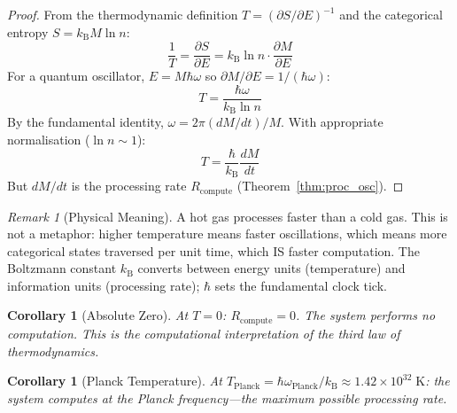 \documentclass[twocolumn,10pt,a4paper]{article}
\theoremstyle{plain}
\newtheorem{corollary}[theorem]{Corollary}
\theoremstyle{definition}
\theoremstyle{remark}
\newtheorem{remark}[theorem]{Remark}
\newcommand{\kB}{k_{\mathrm{B}}}
\begin{document}
\begin{proof}
From the thermodynamic definition $T = (\partial S / \partial E)^{-1}$ and the categorical entropy $S = \kB M \ln n$:
\begin{equation}
    \frac{1}{T} = \frac{\partial S}{\partial E} = \kB \ln n \cdot \frac{\partial M}{\partial E}
\end{equation}
For a quantum oscillator, $E = M\hbar\omega$ so $\partial M/\partial E = 1/(\hbar\omega)$:
\begin{equation}
    T = \frac{\hbar\omega}{\kB \ln n}
\end{equation}
By the fundamental identity, $\omega = 2\pi(dM/dt)/M$. With appropriate normalisation ($\ln n \sim 1$):
\begin{equation}
    T = \frac{\hbar}{\kB}\frac{dM}{dt}
\end{equation}
But $dM/dt$ is the processing rate $R_{\mathrm{compute}}$ (Theorem~\ref{thm:proc_osc}).
\end{proof}

\begin{remark}[Physical Meaning]
A hot gas processes faster than a cold gas. This is not a metaphor: higher temperature means faster oscillations, which means more categorical states traversed per unit time, which IS faster computation. The Boltzmann constant $\kB$ converts between energy units (temperature) and information units (processing rate); $\hbar$ sets the fundamental clock tick.
\end{remark}

\begin{corollary}[Absolute Zero]
At $T = 0$: $R_{\mathrm{compute}} = 0$. The system performs no computation. This is the computational interpretation of the third law of thermodynamics.
\end{corollary}

\begin{corollary}[Planck Temperature]
At $T_{\mathrm{Planck}} = \hbar\omega_{\mathrm{Planck}}/\kB \approx 1.42 \times 10^{32}\;\mathrm{K}$: the system computes at the Planck frequency---the maximum possible processing rate.
\end{corollary}
\end{document}
